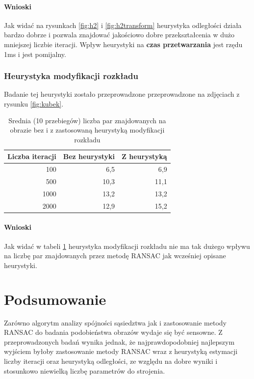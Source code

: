 \documentclass{article}
\begin{document}
	\paragraph{Wnioski}
	Jak widać na rysunkach \ref{fig:h2} i \ref{fig:h2transform} heurystyka odległości działa bardzo dobrze i pozwala znajdować jakościowo dobre przekształcenia w dużo mniejszej liczbie iteracji.
	Wpływ heurystyki na \textbf{czas przetwarzania} jest rzędu 1ms i jest pomijalny.
	
	\subsubsection{Heurystyka modyfikacji rozkładu}
	Badanie tej heurystyki zostało przeprowadzone przeprowadzone na zdjęciach z rysunku \ref{fig:kubek}.
	\begin{table}[H]
		\centering
		\caption{Srednia (10 przebiegów) liczba par znajdowanych na obrazie bez i z zastosowaną heurystyką modyfikacji rozkładu}
		\label{tab:h3}
		\begin{tabular}{|r|r|r|}
			\hline
			\multicolumn{1}{|l|}{\textbf{Liczba iteracji}} & \multicolumn{1}{l|}{\textbf{Bez heurystyki}} & \multicolumn{1}{l|}{\textbf{Z heurystyką}} \\ \hline
			100                                            & 6,5                                          & 6,9                                        \\ \hline
			500                                            & 10,3                                         & 11,1                                       \\ \hline
			1000                                           & 13,2                                         & 13,2                                       \\ \hline
			2000                                           & 12,9                                         & 15,2                                       \\ \hline
		\end{tabular}
	\end{table}
	\paragraph{Wnioski}
	Jak widać w tabeli \ref{tab:h3} heurystyka modyfikacji rozkładu nie ma tak dużego wpływu na liczbę par znajdowanych przez metodę RANSAC jak wcześniej opisane heurystyki.
	\section{Podsumowanie}
	Zarówno algorytm analizy spójności sąsiedztwa jak i zastosowanie metody RANSAC do badania podobieństwa obrazów wydaje się być sensowne. Z przeprowadzonych badań wynika jednak, że najprawdopodobniej najlepszym wyjściem byłoby zastosowanie metody RANSAC wraz z heurystyką estymacji liczby iteracji oraz heurystyką odległości, ze względu na dobre wyniki i stosunkowo niewielką liczbę parametrów do strojenia.
\end{document}

